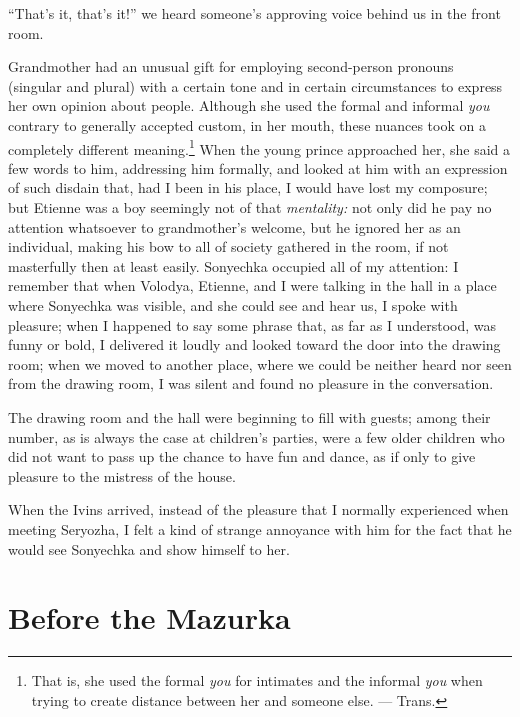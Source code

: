 ``That's it, that's it!'' we heard someone's approving voice behind us in the front room.

Grandmother had an unusual gift for employing second-person pronouns (singular and plural) with a certain tone and in certain circumstances to express her own opinion about people. Although she used the formal and informal \textit{you} contrary to generally accepted custom, in her mouth, these nuances took on a completely different meaning.\footnote{That is, she used the formal \textit{you} for intimates and the informal \textit{you} when trying to create distance between her and someone else. --- Trans.}  When the young prince approached her, she said a few words to him, addressing him formally, and looked at him with an expression of such disdain that, had I been in his place, I would have lost my composure; but Etienne was a boy seemingly not of that \emph{mentality:} not only did he pay no attention whatsoever to grandmother's welcome, but he ignored her as an individual, making his bow to all of society gathered in the room, if not masterfully then at least easily. Sonyechka occupied all of my attention: I remember that when Volodya, Etienne, and I were talking in the hall in a place where Sonyechka was visible, and she could see and hear us, I spoke with pleasure; when I happened to say some phrase that, as far as I understood, was funny or bold, I delivered it loudly and looked toward the door into the drawing room; when we moved to another place, where we could be neither heard nor seen from the drawing room, I was silent and found no pleasure in the conversation. 

The drawing room and the hall were beginning to fill with guests; among their number, as is always the case at children's parties, were a few older children who did not want to pass up the chance to have fun and dance, as if only to give pleasure to the mistress of the house.

When the Ivins arrived, instead of the pleasure that I normally experienced when meeting Seryozha, I felt a kind of strange annoyance with him for the fact that he would see Sonyechka and show himself to her.

\chapter{Before the Mazurka} %

